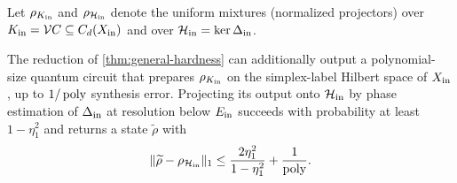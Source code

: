 Let \(\rho_{K_{\rm in}}\) and \(\rho_{\mathcal{H}_{\rm in}}\) denote the uniform
mixtures (normalized projectors) over \(K_{\rm in}=\mathcal{V} C\subseteq C_d(X_{\mathrm{in}})\)
and over \(\mathcal{H}_{\rm in}=\ker\Delta_{\rm in}\).

\begin{theorem}[Preparation]
\label{thm:preparation}
The reduction of \cref{thm:general-hardness} can additionally output a
polynomial-size quantum circuit that prepares \(\rho_{K_{\rm in}}\) on the
simplex-label Hilbert space of \(X_{\mathrm{in}}\), up to \(1/\operatorname{poly}\) synthesis error.
Projecting its output onto \(\mathcal{H}_{\rm in}\) by phase estimation of
\(\Delta_{\rm in}\) at resolution below \(E_{\rm in}\) succeeds with
probability at least \(1-\eta_1^2\) and returns a state \(\widetilde\rho\)
with
\[
\|\widetilde\rho-\rho_{\mathcal{H}_{\rm in}}\|_1\le\frac{2\eta_1^2}{1-\eta_1^2}+\frac1{\operatorname{poly}}.
\]
\end{theorem}

